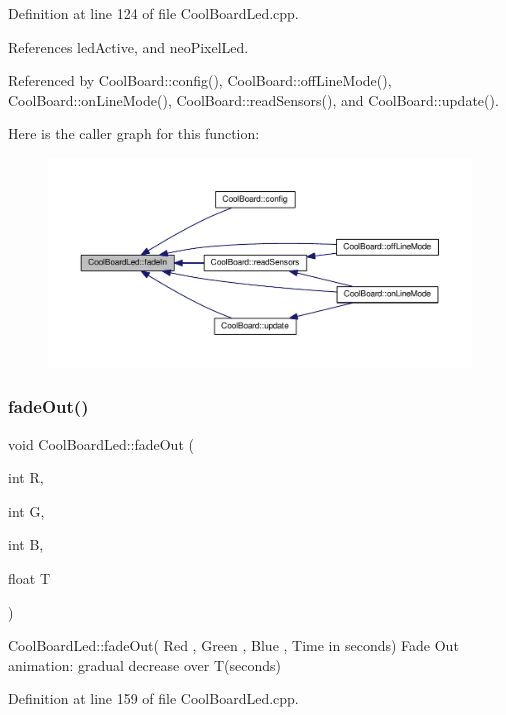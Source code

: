 Definition at line 124 of file Cool\+Board\+Led.\+cpp.



References led\+Active, and neo\+Pixel\+Led.



Referenced by Cool\+Board\+::config(), Cool\+Board\+::off\+Line\+Mode(), Cool\+Board\+::on\+Line\+Mode(), Cool\+Board\+::read\+Sensors(), and Cool\+Board\+::update().

Here is the caller graph for this function\+:
\nopagebreak
\begin{figure}[H]
\begin{center}
\leavevmode
\includegraphics[width=350pt]{de/dc0/class_cool_board_led_ab778f5e7bed0ab74e3906d82110493c3_icgraph}
\end{center}
\end{figure}
\mbox{\label{class_cool_board_led_a93d545679237e8cc858324367149775c}} 
\subsubsection{\texorpdfstring{fade\+Out()}{fadeOut()}}
{\footnotesize\ttfamily void Cool\+Board\+Led\+::fade\+Out (\begin{DoxyParamCaption}\item[{int}]{R,  }\item[{int}]{G,  }\item[{int}]{B,  }\item[{float}]{T }\end{DoxyParamCaption})}

Cool\+Board\+Led\+::fade\+Out( Red , Green , Blue , Time in seconds) Fade Out animation\+: gradual decrease over T(seconds) 

Definition at line 159 of file Cool\+Board\+Led.\+cpp.



